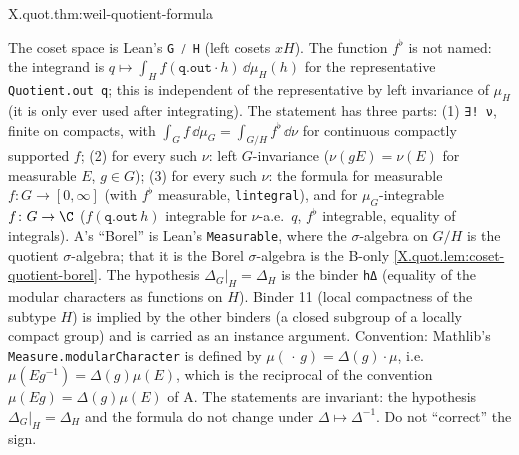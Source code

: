\begin{tfformal}{X.quot.thm:weil-quotient-formula}
\begin{tffidelity}
The coset space is Lean's \texttt{G ⧸ H} (left cosets $xH$). The function $f^\flat$ is not named: the integrand is $q\mapsto\int_Hf(\texttt{q.out}\cdot h)\,\dd\mu_H(h)$ for the representative \texttt{Quotient.out q}; this is independent of the representative by left invariance of $\mu_H$ (it is only ever used after integrating). The statement has three parts: (1) \texttt{∃! ν}, finite on compacts, with $\int_Gf\,\dd\mu_G=\int_{G/H}f^\flat\,\dd\nu$ for continuous compactly supported $f$; (2) for every such $\nu$: left $G$-invariance ($\nu(gE)=\nu(E)$ for measurable $E$, $g\in G$); (3) for every such $\nu$: the formula for measurable $f\colon G\to[0,\infty]$ (with $f^\flat$ measurable, \texttt{lintegral}), and for $\mu_G$-integrable $f\colon G\to\C$ ($f(\texttt{q.out}\,h)$ integrable for $\nu$-a.e.\ $q$, $f^\flat$ integrable, equality of integrals). A's ``Borel'' is Lean's \texttt{Measurable}, where the $\sigma$-algebra on $G/H$ is the quotient $\sigma$-algebra; that it is the Borel $\sigma$-algebra is the B-only \cref{X.quot.lem:coset-quotient-borel}. The hypothesis $\Delta_G|_H=\Delta_H$ is the binder \texttt{hΔ} (equality of the modular characters as functions on $H$). Binder 11 (local compactness of the subtype $H$) is implied by the other binders (a closed subgroup of a locally compact group) and is carried as an instance argument. Convention: Mathlib's \texttt{Measure.modularCharacter} is defined by $\mu(\,\cdot\,g)=\Delta(g)\cdot\mu$, i.e.\ $\mu(Eg^{-1})=\Delta(g)\mu(E)$, which is the reciprocal of the convention $\mu(Eg)=\Delta(g)\mu(E)$ of A. The statements are invariant: the hypothesis $\Delta_G|_H=\Delta_H$ and the formula do not change under $\Delta\mapsto\Delta^{-1}$. Do not ``correct'' the sign.
\end{tffidelity}
\end{tfformal}
